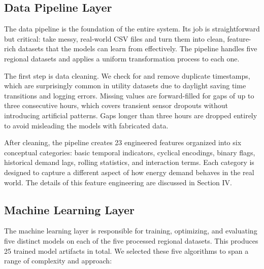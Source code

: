 \documentclass[conference]{IEEEtran}
\begin{document}
\subsection{Data Pipeline Layer}

The data pipeline is the foundation of the entire system. Its job is straightforward but critical: take messy, real-world CSV files and turn them into clean, feature-rich datasets that the models can learn from effectively. The pipeline handles five regional datasets and applies a uniform transformation process to each one.

The first step is data cleaning. We check for and remove duplicate timestamps, which are surprisingly common in utility datasets due to daylight saving time transitions and logging errors. Missing values are forward-filled for gaps of up to three consecutive hours, which covers transient sensor dropouts without introducing artificial patterns. Gaps longer than three hours are dropped entirely to avoid misleading the models with fabricated data. \par

After cleaning, the pipeline creates 23 engineered features organized into six conceptual categories: basic temporal indicators, cyclical encodings, binary flags, historical demand lags, rolling statistics, and interaction terms. Each category is designed to capture a different aspect of how energy demand behaves in the real world. The details of this feature engineering are discussed in Section IV.

\subsection{Machine Learning Layer}

The machine learning layer is responsible for training, optimizing, and evaluating five distinct models on each of the five processed regional datasets. This produces 25 trained model artifacts in total. We selected these five algorithms to span a range of complexity and approach:
\end{document}
